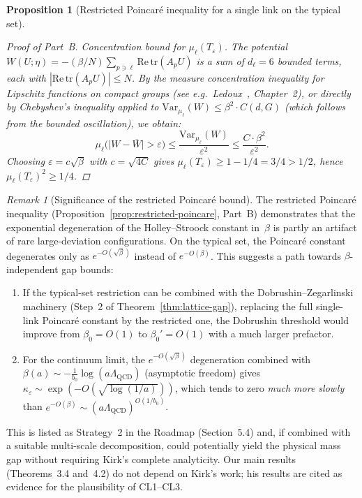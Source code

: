 \documentclass[12pt,a4paper]{article}
\theoremstyle{definition}
\theoremstyle{plain}
\newtheorem{proposition}[definition]{Proposition}
\theoremstyle{remark}
\newtheorem{remark}[definition]{Remark}
\begin{document}
\begin{proposition}[Restricted Poincar\'e inequality for a single link on the typical set]
\begin{proof}[Proof of Part~B]
\emph{Concentration bound for $\mu_\ell(T_\varepsilon)$.}
The potential $W(U;\eta) = -(\beta/N)\sum_{p \ni \ell} \mathrm{Re}\,\mathrm{tr}(A_p U)$ is a sum of $d_\ell = 6$ bounded terms, each with $|\mathrm{Re}\,\mathrm{tr}(A_p U)| \leq N$. By the measure concentration inequality for Lipschitz functions on compact groups (see e.g.\ Ledoux~\cite{Ledoux2001}, Chapter~2), or directly by Chebyshev's inequality applied to $\mathrm{Var}_{\mu_\ell}(W) \leq \beta^2 \cdot C(d,G)$ (which follows from the bounded oscillation), we obtain:
\[
    \mu_\ell\bigl(\bigl|W - \overline{W}\bigr| > \varepsilon\bigr) \leq \frac{\mathrm{Var}_{\mu_\ell}(W)}{\varepsilon^2} \leq \frac{C \cdot \beta^2}{\varepsilon^2}.
\]
Choosing $\varepsilon = c\sqrt{\beta}$ with $c = \sqrt{4C}$ gives $\mu_\ell(T_\varepsilon) \geq 1 - 1/4 = 3/4 > 1/2$, hence $\mu_\ell(T_\varepsilon)^2 \geq 1/4$.
\end{proof}
\end{proposition}

\begin{remark}[Significance of the restricted Poincar\'e bound]
\label{rem:restricted-significance}
The restricted Poincar\'e inequality (Proposition~\ref{prop:restricted-poincare}, Part~B) demonstrates that the exponential degeneration of the Holley--Stroock constant in~$\beta$ is partly an artifact of rare large-deviation configurations. On the typical set, the Poincar\'e constant degenerates only as $e^{-O(\sqrt{\beta})}$ instead of $e^{-O(\beta)}$. This suggests a path towards $\beta$-independent gap bounds:

\begin{enumerate}
    \item If the typical-set restriction can be combined with the Dobrushin--Zegarlinski machinery (Step~2 of Theorem~\ref{thm:lattice-gap}), replacing the full single-link Poincar\'e constant by the restricted one, the Dobrushin threshold would improve from $\beta_0 = O(1)$ to $\beta_0' = O(1)$ with a much larger prefactor.
    \item For the continuum limit, the $e^{-O(\sqrt{\beta})}$ degeneration combined with $\beta(a) \sim -\frac{1}{b_0}\log(a\Lambda_{\mathrm{QCD}})$ (asymptotic freedom) gives $\kappa_\varepsilon \sim \exp(-O(\sqrt{\log(1/a)}))$, which tends to zero \emph{much more slowly} than $e^{-O(\beta)} \sim (a\Lambda_{\mathrm{QCD}})^{O(1/b_0)}$.
\end{enumerate}
This is listed as Strategy~2 in the Roadmap (Section~5.4) and, if combined with a suitable multi-scale decomposition, could potentially yield the physical mass gap without requiring Kirk's complete analyticity. Our main results (Theorems~3.4 and~4.2) do not depend on Kirk's work; his results are cited as evidence for the plausibility of CL1--CL3.
\end{remark}
\end{document}
